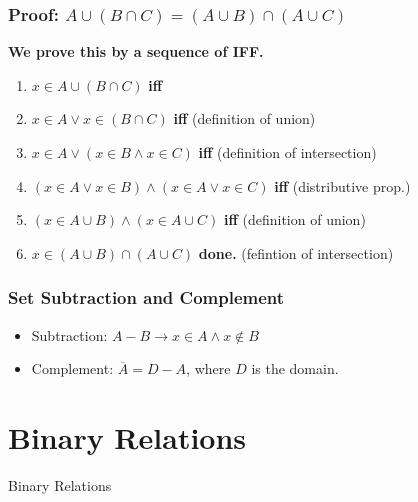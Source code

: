 \documentclass{beamer}
\begin{document}
\begin{frame}
  \frametitle{Proof: $A \cup (B \cap C) = (A\cup B)\cap(A\cup C)$}
  {\larger
    {\bf We prove this by a sequence of IFF.}\\
    \begin{enumerate}
    \item $x \in A \cup (B \cap C)$ {\bf iff}
    \item $x \in A \lor x \in (B \cap C)$ {\bf iff} \hfill (definition of union)
    \item $x \in A \lor (x \in B \land x \in C)$ {\bf iff} \hfill
      (definition of intersection)
    \item $(x \in A \lor x \in B) \land (x\in A \lor x \in C)$ {\bf
      iff} \hfill (distributive prop.)
    \item $(x \in A\cup B) \land (x \in A\cup C)$ {\bf iff}\hfill
      (definition of union)
    \item $x \in (A\cup B)\cap (A\cup C)$ {\bf done.} \hfill
      (fefintion of intersection)
      
    \end{enumerate}
  }
\end{frame}

\begin{frame}
  \frametitle{Set Subtraction and Complement}

  {\larger
    \begin{itemize}
    \item Subtraction: $A - B \rightarrow x \in A \land x \notin B$

      \bigskip
      
    \item Complement: $\overline{A} = D - A$, where $D$ is the domain.
    \end{itemize}
  }             
\end{frame}

\section{Binary Relations}
\begin{frame}
  \begin{center}
    {\huge
      Binary Relations
    }
  \end{center}
\end{frame}
\end{document}
